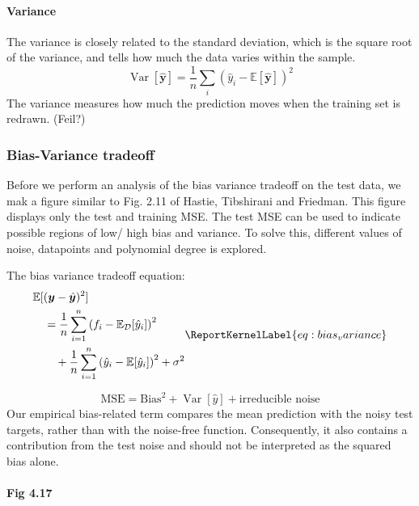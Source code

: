 \documentclass[aps,rmp,reprint,amsmath,amssymb,longbibliography]{revtex4-1}
\let\label\ReportKernelLabel
\begin{document}
\paragraph{Variance}
The variance is closely related to the standard deviation, which is
the square root of the variance, and tells how much the data varies
within the sample.
\begin{equation}
  \operatorname{Var}[\hat{\boldsymbol{y}}]
  = \frac{1}{n}\sum_{i}(\hat{y}_i - \mathbb{E}[\hat{\boldsymbol{y}}])^2
\end{equation} \cite[p.~62]{LectureNotes}
The variance measures how much the prediction moves when the training set is
redrawn. (Feil?)

\subsubsection{Bias-Variance tradeoff}
\label{sec:BV}
Before we perform an analysis of the bias variance tradeoff on the test data,
we mak a figure similar to Fig. 2.11 of Hastie, Tibshirani and Friedman. \cite[p.~38]{StatisticalLearning}
This figure displays only the test and training MSE. The test MSE
can be used to indicate possible regions of low/ high bias and variance.
To solve this, different values of noise, datapoints and polynomial degree is explored.

The bias variance tradeoff equation:
\begin{equation}
  \begin{aligned}
  &\mathbb{E}[
    (\boldsymbol{y}-\hat{\boldsymbol{y}})^2] \\
    &\quad = \frac{1}{n}\sum_{i=1}^{n}
    \left(f_i-\mathbb{E}_{\mathcal{D}}[\hat{y}_i]\right)^2
    \\
    &\qquad + \frac{1}{n}\sum_{i=1}^{n}
    \left(
        \hat{y}_i-\mathbb{E}[\hat{y}_i]
    \right)^2 + \sigma^2
  \end{aligned}
  \label{eq:bias_variance}
\end{equation}

\begin{equation}
  \mathrm{MSE} = \mathrm{Bias}^2 + \operatorname{Var}[\hat{y}]
  + \text{irreducible noise}
\end{equation}
Our empirical bias-related term compares the mean
prediction with the noisy test targets,
rather than with the noise-free function.
Consequently, it also contains a contribution from
the test noise and should not be interpreted as
the squared bias alone.

\paragraph{Fig 4.17}
\end{document}
